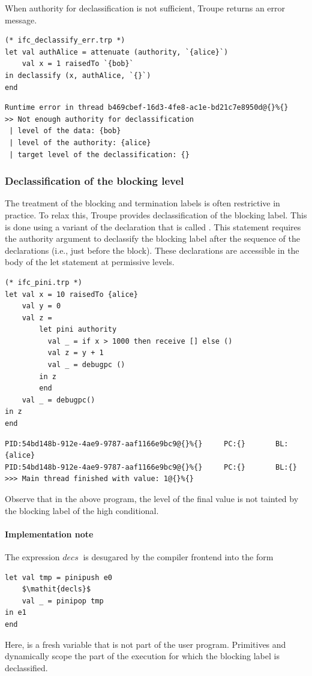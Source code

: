 When authority for declassification is not sufficient, Troupe returns an error message.
\begin{lstlisting}
(* ifc_declassify_err.trp *)
let val authAlice = attenuate (authority, `{alice}`)
    val x = 1 raisedTo `{bob}`
in declassify (x, authAlice, `{}`)
end     
\end{lstlisting}

\begin{lstlisting}
Runtime error in thread b469cbef-16d3-4fe8-ac1e-bd21c7e8950d@{}%{}
>> Not enough authority for declassification
 | level of the data: {bob}
 | level of the authority: {alice}
 | target level of the declassification: {}    
\end{lstlisting}

\subsubsection{Declassification of the blocking level}
\label{sec:pinidecl}
The treatment of the blocking and termination labels is often restrictive in practice. To relax this, 
Troupe provides declassification of the blocking label. This is done using 
a variant of the  declaration that is called . 
This statement requires the authority argument to declassify the blocking label 
after the sequence of the declarations (i.e., just before the  block).
These declarations are accessible in the body of the let statement at permissive
levels.

\begin{lstlisting}
(* ifc_pini.trp *)
let val x = 10 raisedTo {alice}
    val y = 0
    val z = 
        let pini authority
          val _ = if x > 1000 then receive [] else ()
          val z = y + 1
          val _ = debugpc () 
        in z
        end
    val _ = debugpc()
in z
end
\end{lstlisting}

\begin{verbatim}
PID:54bd148b-912e-4ae9-9787-aaf1166e9bc9@{}%{}     PC:{}       BL:{alice}           
PID:54bd148b-912e-4ae9-9787-aaf1166e9bc9@{}%{}     PC:{}       BL:{}            
>>> Main thread finished with value: 1@{}%{}
\end{verbatim}
Observe that in the above program, the level of the final value 
is not tainted by the blocking label of the high conditional. 


\paragraph{Implementation note}
The expression  $\mathit{decs}\ $ is desugared by the compiler frontend into the form 
\begin{lstlisting}
let val tmp = pinipush e0 
    $\mathit{decls}$
    val _ = pinipop tmp
in e1      
end
\end{lstlisting}
Here,  is a fresh variable that is not part of the user program. Primitives  and 
 dynamically scope the part of the execution for which the blocking label is declassified.



